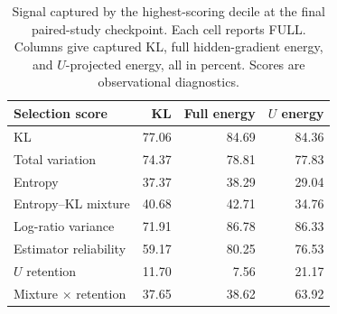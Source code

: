 \begin{table}[!htbp]
\centering
\caption{Signal captured by the highest-scoring decile at the final paired-study checkpoint. Each cell reports FULL. Columns give captured KL, full hidden-gradient energy, and $U$-projected energy, all in percent. Scores are observational diagnostics.}
\label{tab:paired_selectors}
\small
\setlength{\tabcolsep}{3pt}
\begin{tabular}{lrrr}
\toprule
Selection score & KL & Full energy & $U$ energy \\
\midrule
KL & 77.06 & 84.69 & 84.36 \\
Total variation & 74.37 & 78.81 & 77.83 \\
Entropy & 37.37 & 38.29 & 29.04 \\
Entropy--KL mixture & 40.68 & 42.71 & 34.76 \\
Log-ratio variance & 71.91 & 86.78 & 86.33 \\
Estimator reliability & 59.17 & 80.25 & 76.53 \\
$U$ retention & 11.70 & 7.56 & 21.17 \\
Mixture $\times$ retention & 37.65 & 38.62 & 63.92 \\
\bottomrule
\end{tabular}
\end{table}
